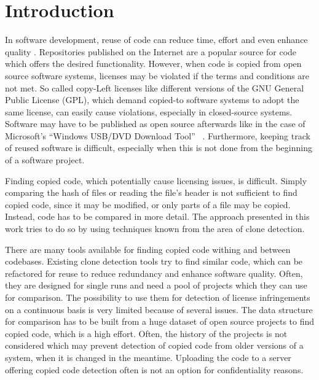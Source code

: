 
\chapter{Introduction}\label{chapter:introduction}
In software development, reuse of code can reduce time, effort and even enhance quality \cite{krueger1992software}.
Repositories published on the Internet are a popular source for code which offers the desired functionality.
However, when code is copied from open source software systems, licenses may be violated if the terms and conditions are not met.
So called copy-Left licenses like different versions of the GNU General Public License (GPL), which demand copied-to software systems to adopt the same license, can easily cause violations, especially in closed-source systems.
Software may have to be published as open source afterwards like in the case of Microsoft's ``Windows USB/DVD Download Tool'' \ \cite{microsoft2009download}.
Furthermore, keeping track of reused software is difficult, especially when this is not done from the beginning of a software project.

Finding copied code, which potentially cause licensing issues, is difficult.
Simply comparing the hash of files or reading the file's header is not sufficient to find copied code, since it may be modified, or only parts of a file may be copied.
Instead, code has to be compared in more detail.
The approach presented in this work tries to do so by using techniques known from the area of clone detection.

There are many tools available for finding copied code withing and between codebases.
Existing clone detection tools try to find similar code, which can be refactored for reuse to reduce redundancy and enhance software quality.
Often, they are designed for single runs and need a pool of projects which they can use for comparison.
The possibility to use them for detection of license infringements on a continuous basis is very limited because of several issues.
The data structure for comparison has to be built from a huge dataset of open source projects to find copied code, which is a high effort.
Often, the history of the projects is not considered which may prevent detection of copied code from older versions of a system, when it is changed in the meantime.
Uploading the code to a server offering copied code detection often is not an option for confidentiality reasons.

